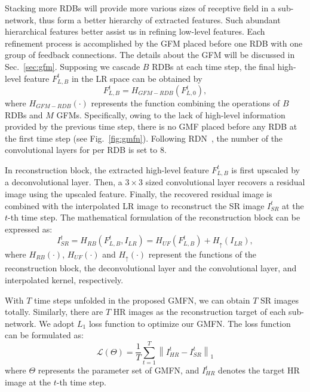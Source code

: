 \documentclass{bmvc2k}
\begin{document}
	Stacking more RDBs will provide more various sizes of receptive field in a sub-network, thus form a better hierarchy of extracted features. 
	Such abundant hierarchical features better assist us in refining low-level features. 
	Each refinement process is accomplished by the GFM placed before one RDB with one group of feedback connections. The details about the GFM will be discussed in Sec.~\ref{sec:gfm}.
	Supposing we cascade $B$ RDBs at each time step, the final high-level feature $F_{L,B}^{t}$ in the LR space can be obtained by
	\begin{equation}
	F_{L,B}^{t}=H_{GFM-RDB}\left(F_{L,0}^{t}\right),
	\end{equation}
	where $H_{GFM-RDB}(\cdot)$ represents the function combining the operations of $B$ RDBs and $M$ GFMs. Specifically, owing to the lack of high-level information provided by the previous time step, there is no GMF placed before any RDB at the first time step (see Fig.~\ref{fig:gmfn}). Following RDN~\cite{zhang2018residual}, the number of the convolutional layers for per RDB is set to 8. 
	
	In reconstruction block, the extracted high-level feature $F_{L,B}^{t}$ is first upscaled by a deconvolutional layer. Then, a $3\times3$ sized convolutional layer recovers a residual image using the upscaled feature. Finally, the recovered residual image is combined with the interpolated LR image to reconstruct the SR image $I^t_{SR}$ at the $t$-th time step. The mathematical formulation of the reconstruction block can be expressed as:
	\begin{equation}
	I^t_{SR}=H_{RB}\left(F_{L,B}^{t}, I_{LR}\right)=H_{UF}\left(F_{L,B}^{t}\right)+H_{\uparrow}\left(I_{LR}\right),
	\end{equation}
	where $H_{RB}(\cdot)$, $H_{UF}(\cdot)$ and $H_{\uparrow}(\cdot)$ represent the functions of the reconstruction block, the deconvolutional layer and the convolutional layer, and interpolated kernel, respectively. 
	
	With $T$ time steps unfolded in the proposed GMFN, we can obtain $T$ SR images totally. Similarly, there are $T$ HR images as the reconstruction target of each sub-network. We adopt $L_{1}$ loss function to optimize our GMFN. The loss function can be formulated as:
	\begin{equation}
	\mathcal{L}(\Theta)=\frac{1}{T}\sum_{t=1}^{T}\left \| I^t_{HR}-I^t_{SR} \right \|_{1}
	\end{equation}
	where $\Theta$ represents the parameter set of GMFN, and $I^t_{HR}$ denotes the target HR image at the $t$-th time step.
	
\end{document}
